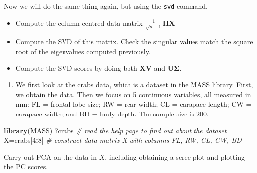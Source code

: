 \documentclass[]{book}
\newenvironment{Shaded}{\begin{snugshade}}{\end{snugshade}}
\newcommand{\CommentTok}[1]{\textcolor[rgb]{0.56,0.35,0.01}{\textit{#1}}}
\newcommand{\DataTypeTok}[1]{\textcolor[rgb]{0.13,0.29,0.53}{#1}}
\newcommand{\DecValTok}[1]{\textcolor[rgb]{0.00,0.00,0.81}{#1}}
\newcommand{\KeywordTok}[1]{\textcolor[rgb]{0.13,0.29,0.53}{\textbf{#1}}}
\newcommand{\NormalTok}[1]{#1}
\newcommand{\OperatorTok}[1]{\textcolor[rgb]{0.81,0.36,0.00}{\textbf{#1}}}
\newcommand{\OtherTok}[1]{\textcolor[rgb]{0.56,0.35,0.01}{#1}}
\newcommand{\StringTok}[1]{\textcolor[rgb]{0.31,0.60,0.02}{#1}}
\providecommand{\tightlist}{%
  \setlength{\itemsep}{0pt}\setlength{\parskip}{0pt}}
\theoremstyle{definition}
\theoremstyle{definition}
\theoremstyle{definition}
\theoremstyle{remark}
\begin{document}
Now we will do the same thing again, but using the \texttt{svd} command.

\begin{itemize}
\tightlist
\item
  Compute the column centred data matrix \(\frac{1}{\sqrt{n-1}}\mathbf H\mathbf X\)
\item
  Compute the SVD of this matrix. Check the singular values match the square root of the eigenvalues computed previously.
\item
  Compute the SVD scores by doing both \(\mathbf X\mathbf V\) and \(\mathbf U\boldsymbol{\Sigma}\).
\end{itemize}

\begin{enumerate}
\def\labelenumi{\arabic{enumi}.}
\setcounter{enumi}{1}
\tightlist
\item
  We first look at the crabs data, which is a dataset in the MASS library. First, we obtain the data.
  Then we focus on 5 continuous variables, all measured in mm: FL = frontal lobe size; RW = rear width; CL = carapace length;
  CW = carapace width; and BD = body depth. The sample size is \(200\).
\end{enumerate}

\begin{Shaded}
\begin{Highlighting}[]
\KeywordTok{library}\NormalTok{(MASS)}
\NormalTok{?crabs           }\CommentTok{# read the help page to find out about the dataset}
\NormalTok{X=crabs[}\DecValTok{4}\OperatorTok{:}\DecValTok{8}\NormalTok{]     }\CommentTok{# construct data matrix X with columns FL, RW, CL, CW, BD}
\end{Highlighting}
\end{Shaded}

Carry out PCA on the data in \(X\), including obtaining a scree plot and plotting the PC scores.

\begin{Shaded}
\end{Shaded}
\end{document}
